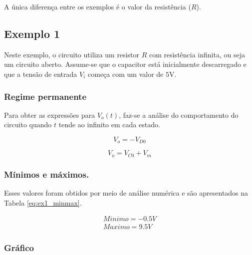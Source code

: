 A única diferença entre os exemplos é o valor da resistência ($R$).


\subsection{Exemplo 1}

Neste exemplo, o circuito utiliza um resistor $R$ com resistência infinita, ou seja um circuito aberto. Assume-se que o capacitor está inicialmente descarregado e que a tensão de entrada $V_i$ começa com um valor de $5$V.

\subsubsection{Regime permanente}

Para obter as expressões para $V_o(t)$, faz-se a análise do comportamento do circuito quando $t$ tende ao infinito em cada estado.

\begin{equation}
    \tag*{Estado 1}
    V_o = - V_{D0}
\end{equation}

\begin{equation}
    \tag*{Estado 2}
    V_o = V_{C0} + V_m
\end{equation}

\subsubsection{Mínimos e máximos.}

Esses valores foram obtidos por meio de análise numérica e são apresentados na Tabela \ref{eq:ex1_minmax}.

\begin{equation}
    \label{eq:ex1_minmax}
    \begin{aligned}
        Minimo = -0.5 V \\
        Maximo = 9.5 V
    \end{aligned}
\end{equation}

\subsubsection{Gráfico}

